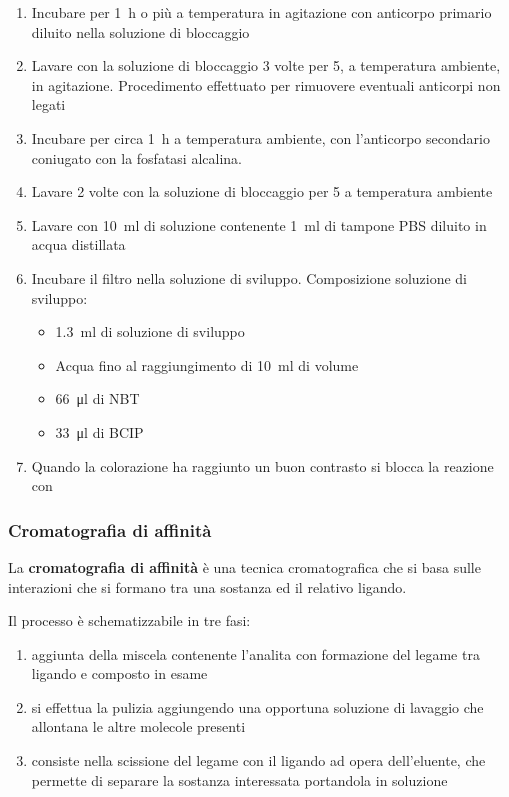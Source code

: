 \begin{enumerate}

	\item Incubare per \qty{1}{\hour} o più a temperatura in agitazione con anticorpo primario diluito nella soluzione di bloccaggio
	\item Lavare con la soluzione di bloccaggio 3 volte per \qty{5}{\min}, a temperatura ambiente, in agitazione. Procedimento effettuato per rimuovere eventuali anticorpi non legati
	\item Incubare per circa \qty{1}{\hour} a temperatura ambiente, con l’anticorpo secondario coniugato con la fosfatasi alcalina.
	\item Lavare 2 volte con la soluzione di bloccaggio per \qty{5}{\min} a temperatura ambiente
	\item Lavare con \qty{10}{\ml} di soluzione contenente \qty{1}{\ml} di tampone PBS diluito in acqua distillata
	\item Incubare il filtro nella soluzione di sviluppo. Composizione soluzione di sviluppo:
	      \begin{itemize}[person]
		      \item \qty{1.3}{\ml} di soluzione di sviluppo
		      \item Acqua fino al raggiungimento di \qty{10}{\ml} di volume
		      \item \qty{66}{\micro\litre} di NBT
		      \item \qty{33}{\micro\litre} di BCIP
	      \end{itemize}
	\item Quando la colorazione ha raggiunto un buon contrasto si blocca la reazione con 
\end{enumerate}

\subsubsection{Cromatografia di affinità}
\begin{Informazione}
	La \textbf{cromatografia di affinità} è una tecnica cromatografica che si basa sulle interazioni che si formano tra una sostanza ed il relativo ligando.

	\vspace*{.3cm}
	Il processo è schematizzabile in tre fasi:
	\begin{enumerate}[person]
		\item aggiunta della miscela contenente l'analita con formazione del legame tra ligando e composto in esame
		\item si effettua la pulizia aggiungendo una opportuna soluzione di lavaggio che allontana le altre molecole presenti
		\item consiste nella scissione del legame con il ligando ad opera dell'eluente, che permette di separare la sostanza interessata portandola in soluzione
	\end{enumerate}
\end{Informazione}

